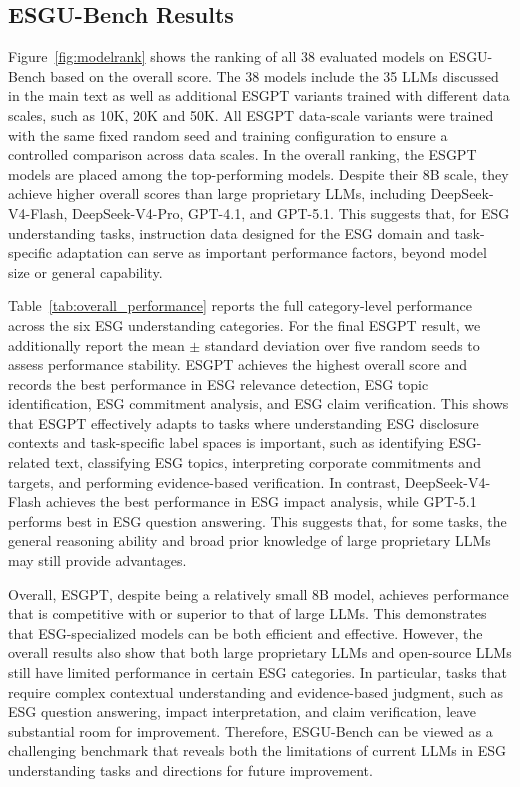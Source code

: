 \documentclass[11pt]{article}
\begin{document}
\subsection{\textsf{ESGU-Bench} Results}
\label{app:full_results}
Figure~\ref{fig:modelrank} shows the ranking of all 38 evaluated models on \textsf{ESGU-Bench} based on the overall score. The 38 models include the 35 LLMs discussed in the main text as well as additional \textsf{ESGPT} variants trained with different data scales, such as 10K, 20K and 50K. All \textsf{ESGPT} data-scale variants were trained with the same fixed random seed and training configuration to ensure a controlled comparison across data scales. In the overall ranking, the \textsf{ESGPT} models are placed among the top-performing models. Despite their 8B scale, they achieve higher overall scores than large proprietary LLMs, including DeepSeek-V4-Flash, DeepSeek-V4-Pro, GPT-4.1, and GPT-5.1. This suggests that, for ESG understanding tasks, instruction data designed for the ESG domain and task-specific adaptation can serve as important performance factors, beyond model size or general capability.

Table~\ref{tab:overall_performance} reports the full category-level performance across the six ESG understanding categories. For the final \textsf{ESGPT} result, we additionally report the mean $\pm$ standard deviation over five random seeds to assess performance stability. \textsf{ESGPT} achieves the highest overall score and records the best performance in ESG relevance detection, ESG topic identification, ESG commitment analysis, and ESG claim verification. This shows that \textsf{ESGPT} effectively adapts to tasks where understanding ESG disclosure contexts and task-specific label spaces is important, such as identifying ESG-related text, classifying ESG topics, interpreting corporate commitments and targets, and performing evidence-based verification. In contrast, DeepSeek-V4-Flash achieves the best performance in ESG impact analysis, while GPT-5.1 performs best in ESG question answering. This suggests that, for some tasks, the general reasoning ability and broad prior knowledge of large proprietary LLMs may still provide advantages.

Overall, \textsf{ESGPT}, despite being a relatively small 8B model, achieves performance that is competitive with or superior to that of large LLMs. This demonstrates that ESG-specialized models can be both efficient and effective. However, the overall results also show that both large proprietary LLMs and open-source LLMs still have limited performance in certain ESG categories. In particular, tasks that require complex contextual understanding and evidence-based judgment, such as ESG question answering, impact interpretation, and claim verification, leave substantial room for improvement. Therefore, \textsf{ESGU-Bench} can be viewed as a challenging benchmark that reveals both the limitations of current LLMs in ESG understanding tasks and directions for future improvement.
\end{document}
